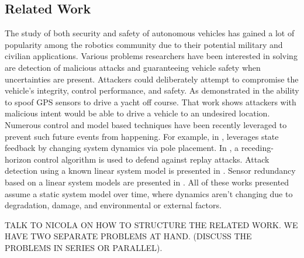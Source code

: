 




\subsection{Related Work}
\label{sec:Related Work}

The study of both security and safety of autonomous vehicles has gained a lot of popularity among the robotics community due to their potential military and civilian applications. Various problems researchers have been interested in solving are detection of malicious attacks and guaranteeing vehicle safety when uncertainties are present. Attackers could deliberately attempt to compromise the vehicle's integrity, control performance, and safety. As demonstrated in \cite{lee} the ability to spoof GPS sensors to drive a yacht off course. That work shows attackers with malicious intent would be able to drive a vehicle to an undesired location. Numerous control and model based techniques have been recently leveraged to prevent such future events from happening. For example, in \cite{6426811}, leverages state feedback by changing system dynamics via pole placement. In \cite{zhu2012resilient}, a receding-horizon control algorithm is used to defend against replay attacks. Attack detection using a known linear system model is presented in \cite{pasqualetti2013attack}. Sensor redundancy based on a linear system models are presented in \cite{fawzi2014secure,6943080,7330811}. All of these works presented assume a static system model over time, where dynamics aren't changing due to degradation, damage, and environmental or external factors.

TALK TO NICOLA ON HOW TO STRUCTURE THE RELATED WORK. WE HAVE TWO SEPARATE PROBLEMS AT HAND. (DISCUSS THE PROBLEMS IN SERIES OR PARALLEL). 

